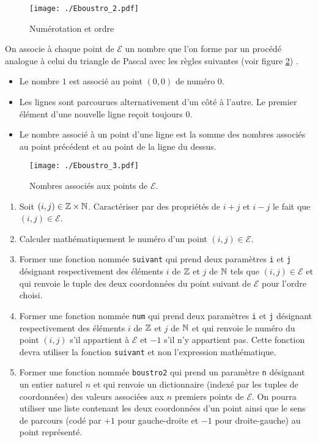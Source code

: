 \begin{enumerate}
\begin{figure}
  \centering
  \texttt{[image: ./Eboustro\_2.pdf]}
  \caption{Numérotation et ordre}
  \label{fig:Eboustro_2}
\end{figure}
On associe à chaque point de $\mathcal{E}$ un nombre que l'on forme par un procédé analogue à celui du triangle de Pascal avec les règles suivantes (voir figure \ref{fig:Eboustro_3}) .
\begin{itemize}
  \item Le nombre $1$ est associé au point $(0,0)$ de numéro $0$.
  \item Les lignes sont parcourues alternativement d'un côté à  l'autre. Le premier élément d'une nouvelle ligne reçoit toujours $0$.
  \item Le nombre associé à un point d'une ligne est la somme des nombres associés au point précédent et au point de la ligne du dessus.
\end{itemize}
\begin{figure}
  \centering
  \texttt{[image: ./Eboustro\_3.pdf]}
  \caption{Nombres associés aux points de $\mathcal{E}$.}
  \label{fig:Eboustro_3}
\end{figure}
\begin{enumerate}
  \item Soit $(i,j)\in \mathbb{Z} \times \mathbb{N}$. Caractériser par des propriétés de $i+j$ et $i-j$ le fait que $(i,j)\in \mathcal{E}$.
  \item Calculer mathématiquement le numéro d'un point $(i,j)\in \mathcal{E}$.
  \item Former une fonction nommée \verb|suivant| qui prend deux paramètres \verb|i| et \verb|j| désignant respectivement des éléments $i$ de $\mathbb{Z}$ et  $j$ de $\mathbb{N}$ tels que $(i,j)\in \mathcal{E}$ et qui renvoie le tuple des deux coordonnées du point suivant de $\mathcal{E}$ pour l'ordre choisi.
  \item Former une fonction nommée \verb|num| qui prend deux paramètres \verb|i| et \verb|j| désignant respectivement des éléments $i$ de $\mathbb{Z}$ et  $j$ de $\mathbb{N}$ et qui renvoie le numéro du point $(i,j)$ s'il appartient à $\mathcal{E}$ et $-1$ s'il n'y appartient pas. Cette fonction devra utiliser la fonction \verb|suivant| et non l'expression mathématique.
  \item Former une fonction nommée \verb|boustro2| qui prend un paramètre \verb|n| désignant un entier naturel $n$ et qui renvoie un dictionnaire (indexé par les tuples de coordonnées) des valeurs associées aux $n$ premiers points de $\mathcal{E}$. On pourra utiliser une liste contenant les deux coordonnées d'un point ainsi que le sens de parcours (codé par $+1$ pour gauche-droite et $-1$ pour droite-gauche) au point représenté. 
\end{enumerate}

\end{enumerate}
